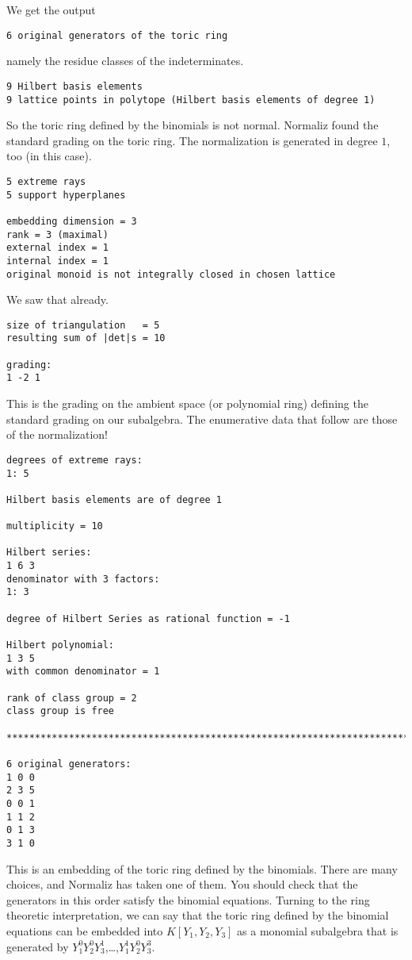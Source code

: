 \documentclass[12pt,a4paper]{scrartcl}
\theoremstyle{definition}
\begin{document}
We get the output
\begin{Verbatim}
6 original generators of the toric ring
\end{Verbatim}
namely the residue classes of the indeterminates.
\begin{Verbatim}
9 Hilbert basis elements
9 lattice points in polytope (Hilbert basis elements of degree 1)
\end{Verbatim}
So the toric ring defined by the binomials is not normal. Normaliz found the standard grading on the toric ring. The normalization is generated in degree $1$, too (in this case). 
\begin{Verbatim}
5 extreme rays
5 support hyperplanes

embedding dimension = 3
rank = 3 (maximal)
external index = 1
internal index = 1
original monoid is not integrally closed in chosen lattice
\end{Verbatim}
We saw that already.
\begin{Verbatim}
size of triangulation   = 5
resulting sum of |det|s = 10

grading:
1 -2 1
\end{Verbatim}
This is the grading on the ambient space (or polynomial ring) defining the standard grading on our subalgebra. The enumerative data that follow are those of the normalization! 
\begin{Verbatim}
degrees of extreme rays:
1: 5  

Hilbert basis elements are of degree 1

multiplicity = 10

Hilbert series:
1 6 3 
denominator with 3 factors:
1: 3  

degree of Hilbert Series as rational function = -1

Hilbert polynomial:
1 3 5 
with common denominator = 1

rank of class group = 2
class group is free

***********************************************************************

6 original generators:
1 0 0
2 3 5
0 0 1
1 1 2
0 1 3
3 1 0
\end{Verbatim}
This is an embedding of the toric ring defined by the binomials. There are many choices, and Normaliz has taken one of them. You should check that the generators in this order satisfy the binomial equations. Turning to the ring theoretic interpretation, we can say that the toric ring defined by the binomial equations can be embedded into $K[Y_1,Y_2,Y_3]$ as a monomial subalgebra that is generated by $Y_1^0Y_2^0Y_3^1$,\dots,$Y_1^1Y_2^0Y_3^3$.
\end{document}
